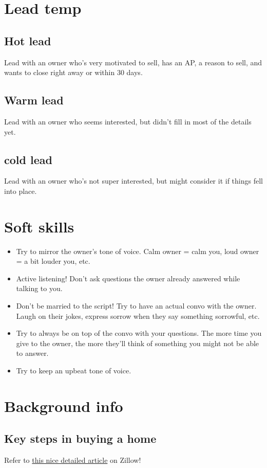 \documentclass[12pt]{article}
\begin{document}
\section{Lead temp}
\subsection{Hot lead}
Lead with an owner who's very motivated to sell, has an AP, a reason to sell, and wants to close right away or within 30 days.
\subsection{Warm lead}
Lead with an owner who seems interested, but didn't fill in most of the details yet.
\subsection{cold lead}
Lead with an owner who's not super interested, but might consider it if things fell into place.

\section{Soft skills}

\begin{itemize}
    \item Try to mirror the owner's tone of voice. Calm owner = calm you, loud owner = a bit louder you, etc.
    \item Active listening! Don't ask questions the owner already answered while talking to you.
    \item Don't be married to the script! Try to have an actual convo with the owner. Laugh on their jokes, express sorrow when they say something sorrowful, etc. 
    \item Try to always be on top of the convo with your questions. The more time you give to the owner, the more they'll think of something you might not be able to answer.
    \item Try to keep an upbeat tone of voice. 
\end{itemize}

\section{Background info}
\subsection{Key steps in buying a home}
Refer to \href{https://www.zillow.com/home-buying-guide/10-steps-to-buying-a-home/}{this nice detailed article} on Zillow!
\end{document}
